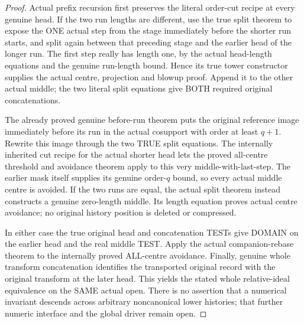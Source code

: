 \begin{proof}
Actual prefix recursion first preserves the literal order-cut recipe at
every genuine head. If the two run lengths are different, use the true
split theorem to expose the ONE actual step from the stage immediately
before the shorter run starts, and split again between that preceding
stage and the earlier head of the longer run. The first step really has
length one, by the actual head-length equations and the genuine run-length
bound. Hence its true tower constructor supplies the actual centre,
projection and blowup proof. Append it to the other actual middle; the
two literal split equations give BOTH required original concatenations.

The already proved genuine before-run theorem puts the original reference
image immediately before its run in the actual cosupport with order at
least $q+1$. Rewrite this image through the two TRUE split equations. The
internally inherited cut recipe for the actual shorter head lets the
proved all-centre threshold and avoidance theorem apply to this very
middle-with-last-step. The earlier mask itself supplies its genuine
order-$q$ bound, so every actual middle centre is avoided. If the two runs
are equal, the actual split theorem instead constructs a genuine
zero-length middle. Its length equation proves actual centre avoidance;
no original history position is deleted or compressed.

In either case the true original head and concatenation TESTs give
DOMAIN on the earlier head and the real middle TEST. Apply the actual
companion-rebase theorem to the internally proved ALL-centre avoidance.
Finally, genuine whole transform concatenation identifies the transported
original record with the original transform at the later head. This yields
the stated whole relative-ideal equivalence on the SAME actual open.
There is no assertion that a numerical invariant descends across arbitrary
noncanonical lower histories; that further numeric interface and the
global driver remain open.
\end{proof}
